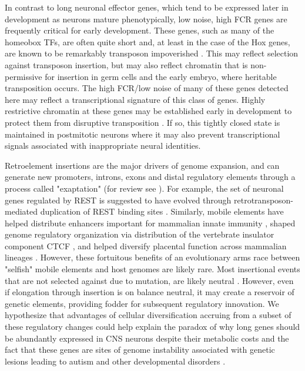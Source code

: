 In contrast to long neuronal effector genes, which tend to be expressed later in development as neurons mature phenotypically, low noise, high FCR genes are frequently critical for early development. These genes, such as many of the homeobox TFs, are often quite short and, at least in the case of the Hox genes, are known to be remarkably transposon impoverished \citep{Chinwalla_2002,Simons_2005}. This may reflect selection against transposon insertion, but may also reflect chromatin that is non-permissive for insertion in germ cells and the early embryo, where heritable transposition occurs. The high FCR/low noise of many of these genes detected here may reflect a transcriptional signature of this class of genes. Highly restrictive chromatin at these genes may be established early in development to protect them from disruptive transposition \citep{Montavon_2014}. If so, this tightly closed state is maintained in postmitotic neurons where it may also prevent transcriptional signals associated with inappropriate neural identities. 

Retroelement insertions are the major drivers of genome expansion, and can generate new promoters, introns, exons and distal regulatory elements through a process called "exaptation" (for review see \citealt{Chuong_2016}). For example, the set of neuronal genes regulated by REST is suggested to have evolved through retrotransposon-mediated duplication of REST binding sites \citep{Johnson_2006}. Similarly, mobile elements have helped distribute enhancers important for mammalian innate immunity \citep{Chuong_2016a}, shaped genome regulatory organization via distribution of the vertebrate insulator component CTCF \citep{Schmidt_2012}, and helped diversify placental function across mammalian lineages \citep{Chuong_2013}. However, these fortuitous benefits of an evolutionary arms race between "selfish" mobile elements and host genomes are likely rare. Most insertional events that are not selected against due to mutation, are likely neutral \citep{Zhang_2011}. However, even if elongation through insertion is on balance neutral, it may create a reservoir of genetic elements, providing fodder for subsequent regulatory innovation. We hypothesize that advantages of cellular diversification accruing from a subset of these regulatory changes could help explain the paradox of why long genes should be abundantly expressed in CNS neurons despite their metabolic costs and the fact that these genes are sites of genome instability associated with genetic lesions leading to autism and other developmental disorders \citep{Wei_2016}. 




